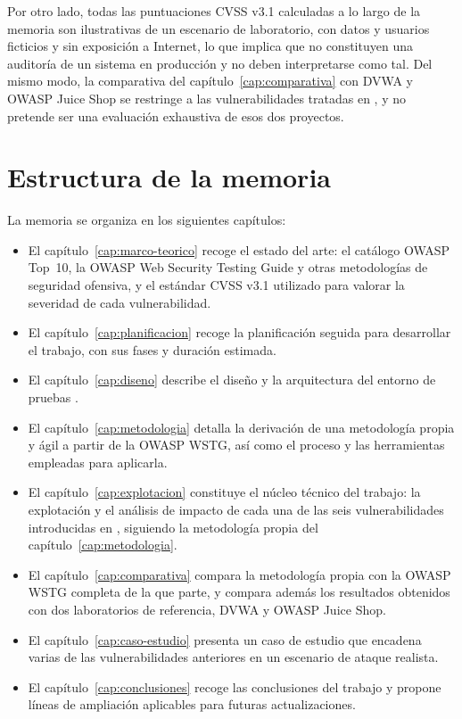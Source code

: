 Por otro lado, todas las puntuaciones CVSS v3.1 calculadas a lo largo de la memoria son
ilustrativas de un escenario de laboratorio, con datos y usuarios ficticios y
sin exposición a Internet, lo que implica que no constituyen una auditoría de un sistema 
en producción y no deben interpretarse como tal. Del mismo modo, la comparativa
del capítulo~\ref{cap:comparativa} con DVWA y OWASP Juice Shop se restringe a
las vulnerabilidades tratadas en \breachlab, y no pretende ser una evaluación
exhaustiva de esos dos proyectos.

\section{Estructura de la memoria}

La memoria se organiza en los siguientes capítulos:

\begin{itemize}
\item El capítulo~\ref{cap:marco-teorico} recoge el estado del arte: el
  catálogo OWASP Top~10, la OWASP Web Security Testing Guide y otras
  metodologías de seguridad ofensiva, y el estándar CVSS v3.1 utilizado para
  valorar la severidad de cada vulnerabilidad.
\item El capítulo~\ref{cap:planificacion} recoge la planificación seguida
  para desarrollar el trabajo, con sus fases y duración estimada.
\item El capítulo~\ref{cap:diseno} describe el diseño y la arquitectura del
  entorno de pruebas \breachlab.
\item El capítulo~\ref{cap:metodologia} detalla la derivación de una
  metodología propia y ágil a partir de la OWASP WSTG, así como el proceso
  y las herramientas empleadas para aplicarla.
\item El capítulo~\ref{cap:explotacion} constituye el núcleo técnico del
  trabajo: la explotación y el análisis de impacto de cada una de las seis
  vulnerabilidades introducidas en \breachlab, siguiendo la metodología
  propia del capítulo~\ref{cap:metodologia}.
\item El capítulo~\ref{cap:comparativa} compara la metodología propia con la
  OWASP WSTG completa de la que parte, y compara además los resultados
  obtenidos con dos laboratorios de referencia, DVWA y OWASP Juice Shop.
\item El capítulo~\ref{cap:caso-estudio} presenta un caso de estudio que
  encadena varias de las vulnerabilidades anteriores en un escenario de
  ataque realista.
\item El capítulo~\ref{cap:conclusiones} recoge las conclusiones del trabajo
  y propone líneas de ampliación aplicables para futuras actualizaciones.
\end{itemize}
